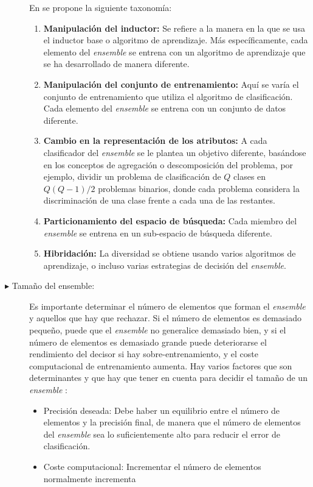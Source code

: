 \begin{description}
En \cite{Rokach2009} se propone la siguiente taxonomía:
\begin{enumerate}
\item \textbf{Manipulación del inductor:} Se refiere a la manera en la que se usa el
inductor base o algoritmo de aprendizaje. Más específicamente, cada elemento del
\textit{ensemble} se entrena con un algoritmo de aprendizaje que se ha desarrollado de
manera diferente.
\item \textbf{Manipulación del conjunto de entrenamiento:} Aquí se varía el conjunto de
entrenamiento que utiliza el algoritmo de clasificación. Cada elemento del
\textit{ensemble} se entrena con un conjunto de datos diferente.
\item \textbf{Cambio en la representación de los atributos:} A cada clasificador del
\textit{ensemble} se le plantea un objetivo diferente, basándose en los
conceptos de agregación o descomposición del problema, por ejemplo, dividir un problema de
clasificación de $Q$
clases en $Q(Q-1)/2$ problemas binarios, donde cada problema considera la discriminación
de una clase frente a cada una de las restantes.
\item \textbf{Particionamiento del espacio de búsqueda:} Cada miembro del
\textit{ensemble} se entrena en un sub-espacio de búsqueda diferente.
\item \textbf{Hibridación:} La diversidad se obtiene usando varios algoritmos de
aprendizaje, o incluso varias estrategias de	decisión del \textit{ensemble}.
\end{enumerate}
\item[$\blacktriangleright$ Tamaño del ensemble:] Es importante determinar el número de
elementos que
forman el \textit{ensemble} y aquellos que hay que rechazar. Si el número de elementos
es demasiado pequeño, puede que el \textit{ensemble} no generalice demasiado bien, y si
el número de elementos es demasiado grande puede deteriorarse el rendimiento del decisor
si hay sobre-entrenamiento, y el coste computacional de entrenamiento aumenta. Hay varios
factores que son determinantes y que hay que tener en cuenta para decidir el tamaño
de un \textit{ensemble} \cite{Rokach2009}:
\begin{itemize}
\item Precisión deseada: Debe haber un equilibrio entre el número de elementos y la
precisión final, de manera que el número de elementos del \textit{ensemble} sea lo
suficientemente alto para reducir el error de clasificación.
\item Coste computacional: Incrementar el número de elementos normalmente incrementa

\end{itemize}
\end{description}
